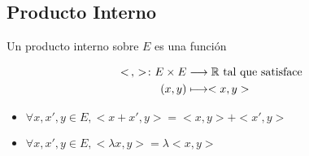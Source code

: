 \subsection{Producto Interno}
Un producto interno sobre $E$ es una función

 
\begin{align*}
    <\, ,\, > \colon E \times E &\longrightarrow \mathbb{R} \text{  tal que satisface}\\
    (x,y) & \longmapsto <x,y> \\
\end{align*}
\begin{itemize}
    \item $\forall x, x', y \in E, <x+x',y> = <x,y> + <x',y>$
    \item $\forall x, x', y \in E, <\lambda x,y> = \lambda <x,y>$
\end{itemize}